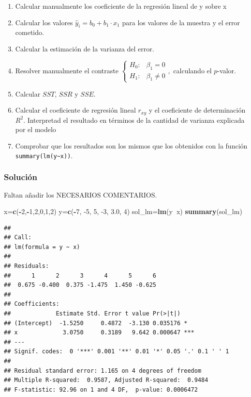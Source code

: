 \documentclass[
]{article}
\newenvironment{Shaded}{\begin{snugshade}}{\end{snugshade}}
\newcommand{\DecValTok}[1]{\textcolor[rgb]{0.00,0.00,0.81}{#1}}
\newcommand{\FloatTok}[1]{\textcolor[rgb]{0.00,0.00,0.81}{#1}}
\newcommand{\KeywordTok}[1]{\textcolor[rgb]{0.13,0.29,0.53}{\textbf{#1}}}
\newcommand{\NormalTok}[1]{#1}
\newcommand{\OperatorTok}[1]{\textcolor[rgb]{0.81,0.36,0.00}{\textbf{#1}}}
\providecommand{\tightlist}{%
  \setlength{\itemsep}{0pt}\setlength{\parskip}{0pt}}
\begin{document}
\begin{enumerate}
\def\labelenumi{\arabic{enumi}.}
\tightlist
\item
  Calcular manualmente los coeficiente de la regresión lineal de y sobre
  x
\item
  Calcular los valores \(\hat{y}_i=b_0+b_1\cdot x_1\) para los valores
  de la muestra y el error cometido.
\item
  Calcular la estimación de la varianza del error.
\item
  Resolver manualmente el contraste
  \(\left\{\begin{array}{ll} H_0: & \beta_1=0 \\ H_1: & \beta_1\not=0\end{array}\right.,\)
  calculando el \(p\)-valor.
\item
  Calcular \(SST\), \(SSR\) y \(SSE\).
\item
  Calcular el coeficiente de regresión lineal \(r_{xy}\) y el
  coeficiente de determinación \(R^2\). Interpretad el resultado en
  términos de la cantidad de varianza explicada por el modelo
\item
  Comprobar que los resultados son los mismos que los obtenidos con la
  función \texttt{summary(lm(y\textasciitilde{}x))}.
\end{enumerate}

\hypertarget{soluciuxf3n-3}{%
\subsubsection{Solución}\label{soluciuxf3n-3}}

Faltan añadir los NECESARIOS COMENTARIOS.

\begin{Shaded}
\begin{Highlighting}[]
\NormalTok{x=}\KeywordTok{c}\NormalTok{(}\OperatorTok{-}\DecValTok{2}\NormalTok{,}\OperatorTok{-}\DecValTok{1}\NormalTok{,}\DecValTok{2}\NormalTok{,}\DecValTok{0}\NormalTok{,}\DecValTok{1}\NormalTok{,}\DecValTok{2}\NormalTok{)}
\NormalTok{y=}\KeywordTok{c}\NormalTok{(}\OperatorTok{-}\DecValTok{7}\NormalTok{, }\DecValTok{-5}\NormalTok{,  }\DecValTok{5}\NormalTok{, }\DecValTok{-3}\NormalTok{,  }\FloatTok{3.0}\NormalTok{,  }\DecValTok{4}\NormalTok{)}
\NormalTok{sol_lm=}\KeywordTok{lm}\NormalTok{(y}\OperatorTok{~}\NormalTok{x)}
\KeywordTok{summary}\NormalTok{(sol_lm)}
\end{Highlighting}
\end{Shaded}

\begin{verbatim}
## 
## Call:
## lm(formula = y ~ x)
## 
## Residuals:
##      1      2      3      4      5      6 
##  0.675 -0.400  0.375 -1.475  1.450 -0.625 
## 
## Coefficients:
##             Estimate Std. Error t value Pr(>|t|)    
## (Intercept)  -1.5250     0.4872  -3.130 0.035176 *  
## x             3.0750     0.3189   9.642 0.000647 ***
## ---
## Signif. codes:  0 '***' 0.001 '**' 0.01 '*' 0.05 '.' 0.1 ' ' 1
## 
## Residual standard error: 1.165 on 4 degrees of freedom
## Multiple R-squared:  0.9587, Adjusted R-squared:  0.9484 
## F-statistic: 92.96 on 1 and 4 DF,  p-value: 0.0006472
\end{verbatim}
\end{document}
